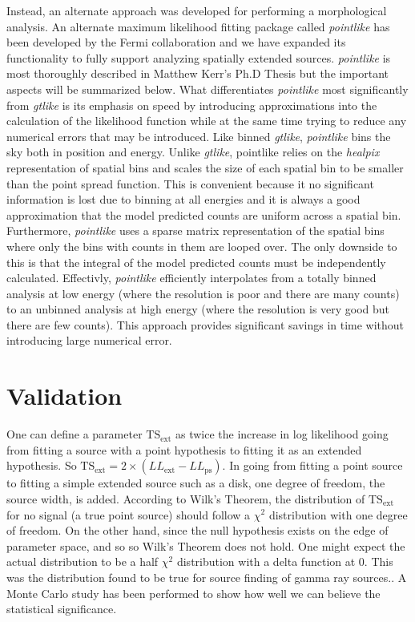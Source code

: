 \documentclass[12pt]{article}
\begin{document}
Instead, an alternate approach was developed for performing
a morphological analysis. An alternate maximum likelihood fitting
package called {\em pointlike} has been developed by the Fermi
collaboration and we have expanded its functionality to fully support
analyzing spatially extended sources. {\em pointlike} is most thoroughly
described in Matthew Kerr's Ph.D Thesis\cite{Matthew_kerr_phd_thesis}
but the important aspects will be summarized below. What differentiates
{\em pointlike} most significantly from {\em gtlike} is its emphasis
on speed by introducing approximations into the calculation of the
likelihood function while at the same time trying to reduce any
numerical errors that may be introduced.  Like binned {\em gtlike},
{\em pointlike} bins the sky both in position and energy.  Unlike {\em
gtlike}, pointlike relies on the {\em healpix} representation of spatial
bins\cite{healpix_paper} and scales the size of each spatial bin to be
smaller than the point spread function. This is convenient because it no
significant information is lost due to binning at all energies and it is
always a good approximation that the model predicted counts are uniform
across a spatial bin. Furthermore, {\em pointlike} uses a sparse matrix
representation of the spatial bins where only the bins with counts in
them are looped over. The only downside to this is that the integral of
the model predicted counts must be independently calculated.  Effectivly,
{\em pointlike} efficiently interpolates from a totally binned analysis
at low energy (where the resolution is poor and there are many counts)
to an unbinned analysis at high energy (where the resolution is very good
but there are few counts). This approach provides significant savings
in time without introducing large numerical error.



\section{Validation}

One can define a parameter $\text{TS}_\text{ext}$ as twice the increase
in log likelihood going from fitting a source with a point hypothesis to fitting
it as an extended hypothesis. So $\text{TS}_\text{ext}=2\times(LL_\text{ext}-LL_\text{ps})$.
In going from fitting a point source to fitting a simple extended source such as
a disk, one degree of freedom, the source width, is added. According to
Wilk's Theorem, the distribution of $\text{TS}_\text{ext}$ for no signal (a true
point source) should follow a $\chi^2$ distribution with one degree of freedom\cite{Wilks_Theorem}.
On the other hand, since the null hypothesis exists on the edge of parameter space,
and so so Wilk's Theorem does not hold\cite{Warnings about Wilk's Thorem}.
One might expect the actual distribution to be a half $\chi^2$ distribution with a delta
function at 0. This was the distribution found to be true for source finding of
gamma ray sources.\cite{Mattox_et_All_Paper}. A Monte Carlo study has been performed to
show how well we can believe the statistical significance.
\end{document}
